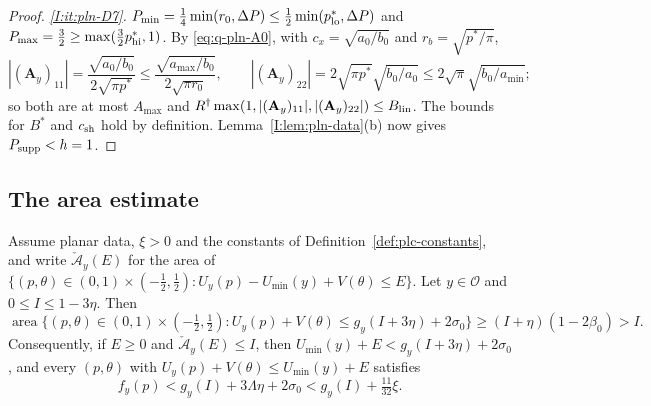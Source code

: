 \begin{proof}
\emph{\ref{I:it:pln-D7}.} $P_{\min}=\frac14\min(r_0,\Delta P)\le\frac12\min(p^*_{\rm lo},\Delta P)$ and
$P_{\max}=\frac32\ge\max(\frac32p^*_{\rm hi},1)$. By \eqref{eq:q-pln-A0}, with $c_x=\sqrt{a_0/b_0}$ and
$r_b=\sqrt{p^*/\pi}$,
\[
 |(\mathbf A_y)_{11}|=\frac{\sqrt{a_0/b_0}}{2\sqrt{\pi p^*}}\le\frac{\sqrt{a_{\max}/b_0}}{2\sqrt{\pi r_0}},\qquad
 |(\mathbf A_y)_{22}|=2\sqrt{\pi p^*}\sqrt{b_0/a_0}\le2\sqrt\pi\sqrt{b_0/a_{\min}};
\]
so both are at most $A_{\max}$ and $R^\dagger\max(1,|(\mathbf A_y)_{11}|,|(\mathbf A_y)_{22}|)\le B_{\rm lin}$. The
bounds for $B^*$ and $c_{\rm sh}$ hold by definition. Lemma~\ref{I:lem:pln-data}(b) now gives $P_{\rm supp}<h=1$.
\end{proof}

\subsection{The area estimate}\label{sec:plc-area}

\begin{lemma}\label{lem:plc-area}
Assume planar data, $\xi>0$ and the constants of Definition~\ref{def:plc-constants}, and write $\check{\mathcal A}_y(E)$
for the area of $\{(p,\theta)\in(0,1)\times(-\frac12,\frac12):U_y(p)-U_{\min}(y)+V(\theta)\le E\}$. Let $y\in\mathcal O$ and
$0\le I\le1-3\eta$. Then
\begin{equation}\label{eq:plc-area}
 \operatorname{area}\bigl\{(p,\theta)\in(0,1)\times(-\tfrac12,\tfrac12):U_y(p)+V(\theta)\le g_y(I+3\eta)+2\sigma_0\bigr\}
 \ge(I+\eta)(1-2\beta_0)>I.
\end{equation}
Consequently, if $E\ge0$ and $\check{\mathcal A}_y(E)\le I$, then $U_{\min}(y)+E<g_y(I+3\eta)+2\sigma_0$, and every $(p,\theta)$ with
$U_y(p)+V(\theta)\le U_{\min}(y)+E$ satisfies
\begin{equation}\label{eq:plc-core-value}
 f_y(p)<g_y(I)+3\Lambda\eta+2\sigma_0<g_y(I)+\tfrac{11}{32}\xi .
\end{equation}
\end{lemma}

